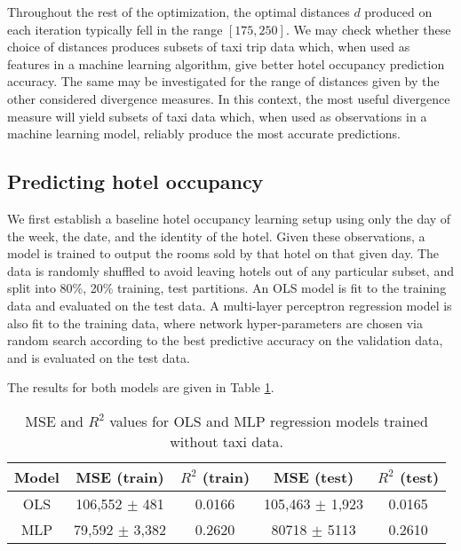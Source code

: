 \documentclass[useAMS, usenatbib]{biom}
\begin{document}
Throughout the rest of the optimization, the optimal distances $d$ produced on each iteration typically fell in the range $[175, 250]$. We may check whether these choice of distances produces subsets of taxi trip data which, when used as features in a machine learning algorithm, give better hotel occupancy prediction accuracy. The same may be investigated for the range of distances given by the other considered divergence measures. In this context, the most useful divergence measure will yield subsets of taxi data which, when used as observations in a machine learning model, reliably produce the most accurate predictions.

\subsection{Predicting hotel occupancy}
\label{ss:predicting}

We first establish a baseline hotel occupancy learning setup using only the day of the week, the date, and the identity of the hotel. Given these observations, a model is trained to output the rooms sold by that hotel on that given day. The data is randomly shuffled to avoid leaving hotels out of any particular subset, and split into 80\%, 20\% training, test partitions. An OLS model is fit to the training data and evaluated on the test data. A multi-layer perceptron regression model is also fit to the training data, where network hyper-parameters are chosen via random search according to the best predictive accuracy on the validation data, and is evaluated on the test data.

The results for both models are given in Table \ref{t:baseline_performance}.

\begin{table}
\caption{MSE and $R^2$ values for OLS and MLP regression models trained without taxi data.}
\label{t:baseline_performance}
\begin{center}
\resizebox{\columnwidth}{!}
{
 \begin{tabular}{||c|c|c|c|c||}
 \hline
 Model & MSE (train) & $R^2$ (train) & MSE (test) & $R^2$ (test) \\
 \hline
 OLS & 106,552 $\pm$ 481 & 0.0166 & 105,463 $\pm$ 1,923 & 0.0165 \\
 MLP & 79,592 $\pm$ 3,382 & 0.2620 & 80718 $\pm$ 5113 & 0.2610 \\
 \hline
\end{tabular}
}
\end{center}
\end{table}
\end{document}
